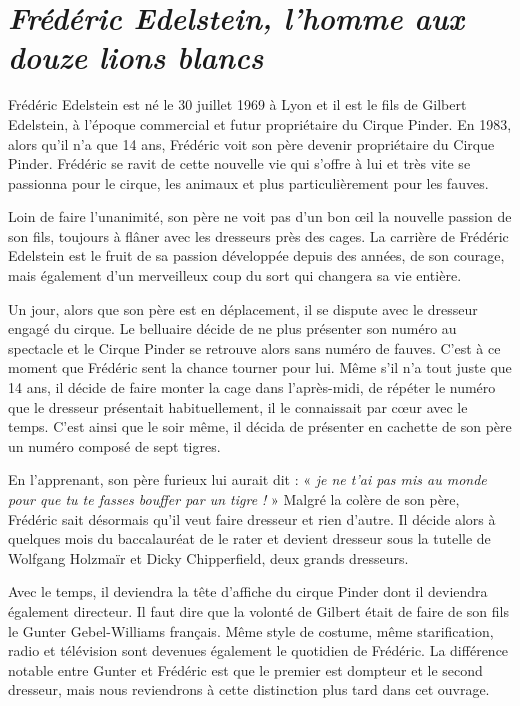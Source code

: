 \section*{\textit{Frédéric Edelstein, l’homme aux douze lions blancs}}
{}

Frédéric Edelstein est né le 30 juillet 1969 à Lyon et il est le fils de Gilbert Edelstein, à l’époque commercial et futur propriétaire du Cirque Pinder. En 1983, alors qu'il n'a que 14 ans, Frédéric voit son père devenir propriétaire du Cirque Pinder. Frédéric se ravit de cette nouvelle vie qui s’offre à lui et très vite se passionna pour le cirque, les animaux et plus particulièrement pour les fauves.

Loin de faire l’unanimité, son père ne voit pas d’un bon œil la nouvelle passion de son fils, toujours à flâner avec les dresseurs près des cages. La carrière de Frédéric Edelstein est le fruit de sa passion développée depuis des années, de son courage, mais également d'un merveilleux coup du sort qui changera sa vie entière.

Un jour, alors que son père est en déplacement, il se dispute avec le dresseur engagé du cirque. Le belluaire décide de ne plus présenter son numéro au spectacle et le Cirque Pinder se retrouve alors sans numéro de fauves. C’est à ce moment que Frédéric sent la chance tourner pour lui. Même s'il n’a tout juste que 14 ans, il décide de faire monter la cage dans l’après-midi, de répéter le numéro que le dresseur présentait habituellement, il le connaissait par cœur avec le temps. C’est ainsi que le soir même, il décida de présenter en cachette de son père un numéro composé de sept tigres.

En l’apprenant, son père furieux lui aurait dit : « \textit{je ne t’ai pas mis au monde pour que tu te fasses bouffer par un tigre !} » Malgré la colère de son père, Frédéric sait désormais qu’il veut faire dresseur et rien d’autre. Il décide alors à quelques mois du baccalauréat de le rater et devient dresseur sous la tutelle de Wolfgang Holzmaïr et Dicky Chipperfield, deux grands dresseurs.

Avec le temps, il deviendra la tête d’affiche du cirque Pinder dont il deviendra également directeur. Il faut dire que la volonté de Gilbert était de faire de son fils le Gunter Gebel-Williams français. Même style de costume, même starification, radio et télévision sont devenues également le quotidien de Frédéric. La différence notable entre Gunter et Frédéric est que le premier est dompteur et le second dresseur, mais nous reviendrons à cette distinction plus tard dans cet ouvrage.

